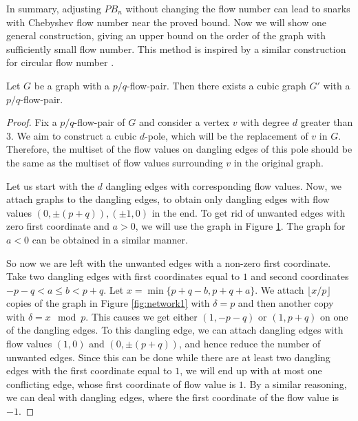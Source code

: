 In summary, adjusting $PB_n$ without changing the flow number can lead to snarks with Chebyshev flow number near the proved bound. Now we will show one general construction, giving an upper bound on the order of the graph with sufficiently small flow number. This method is inspired by a similar construction for circular flow number \cite[pp. 193-195]{given_flow_number}.

\begin{proposition}
Let $G$ be a graph with a $p/q$-flow-pair. Then there exists a cubic graph $G'$ with a $p/q$-flow-pair.
\end{proposition}
\begin{proof}
Fix a $p/q$-flow-pair of $G$ and consider a vertex $v$ with degree $d$ greater than $3$. We aim to construct a cubic $d$-pole, which will be the replacement of $v$ in $G$. Therefore, the multiset of the flow values on dangling edges of this pole should be the same as the multiset of flow values surrounding $v$ in the original graph.

Let us start with the $d$ dangling edges with corresponding flow values. Now, we attach graphs to the dangling edges, to obtain only dangling edges with flow values $(0, \pm(p+q)), (\pm 1, 0)$ in the end. To get rid of unwanted edges with zero first coordinate and $a>0$, we will use the graph in Figure \ref{fig:network0}. The graph for $a<0$ can be obtained in a similar manner.
\begin{figure}[h!]
 \captionsetup{labelsep=none}
 \centering 
 
 \caption{}
 \label{fig:network0}
\end{figure}

So now we are left with the unwanted edges with a non-zero first coordinate. Take two dangling edges with first coordinates equal to $1$ and second coordinates $-p-q < a \leq b < p+q$. Let $x=\min\{p+q-b, p+q+a\}$. We attach $\lfloor x/p\rfloor$ copies of the graph in Figure \ref{fig:network1} with $\delta=p$ and then another copy with $\delta=x\mod p$. This causes we get either $(1, -p-q)$ or $(1, p+q)$ on one of the dangling edges. To this dangling edge, we can attach dangling edges with flow values $(1, 0)$ and $(0, \pm(p+q))$, and hence reduce the number of unwanted edges. Since this can be done while there are at least two dangling edges with the first coordinate equal to $1$, we will end up with at most one conflicting edge, whose first coordinate of flow value is $1$. By a similar reasoning, we can deal with dangling edges, where the first coordinate of the flow value is $-1$.


\end{proof}
